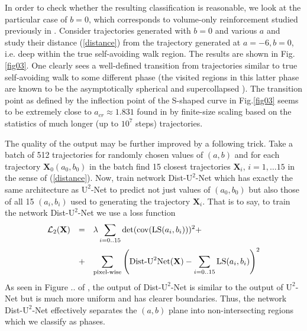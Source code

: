 \documentclass[aps,a4paper,twocolumn,showpacs]{revtex4}
\newcommand{\eq}[1]{(\ref{#1})}
\newcommand{\fig}[1]{Fig.\ref{#1}}
\newcommand{\be}{\begin{equation}}
\newcommand{\ee}{\end{equation}}
\newcommand{\ve}{\mathbf}
\begin{document}
In order to check whether the resulting classification is reasonable, we look at the particular case of $b=0$, which corresponds to volume-only reinforcement studied previously in \cite{sapozhnikov, ordemann1, ordemann2,foster}. Consider trajectories generated with $b=0$ and various $a$ and study their distance \eq{distance} from the trajectory generated at $a=-6,b=0$, i.e. deep within the true self-avoiding walk \cite{amit_parisi_peliti83} region. The results are shown in \fig{fig03}. One clearly sees a well-defined transition from trajectories similar to true self-avoiding walk to some different phase (the visited regions in this latter phase are known to be the asymptotically spherical and supercollapsed \cite{sapozhnikov, ordemann1}). The transition point as defined by the inflection point of the S-shaped curve in \fig{fig03} seems to be extremely close to $a_{cr} \approx 1.831$ found in  \cite{ordemann1} by finite-size scaling based on the statistics of much longer (up to $10^7$ steps) trajectories.   

The quality of the output may be further improved by a following trick.  Take a batch of 512 trajectories for randomly chosen values of $(a,b)$ and for each trajectory $\ve X_0 (a_0,b_0)$ in the batch find 15 closest trajectories $\ve X_i, \, i=1,\dots 15$ in the sense of \eq{distance}. Now, train network Dist-$\text{U}^{2}$-Net which has exactly the same architecture as $\text{U}^{2}$-Net to predict not just values of $(a_0,b_0)$ but also those of all 15 $(a_i,b_i)$ used to generating the trajectory $\ve X_i$. That is to say, to train the network Dist-$\text{U}^{2}$-Net we use a loss function  
\be
\begin{array}{rll}
 \mathcal{L}_2(\ve X) & = & \displaystyle \lambda \sum_{i=0..15} \det(\text{cov}(\text{LS}(a_i,b_i)))^{2} + \medskip \\
& + & \displaystyle \sum_{\text{pixel-wise}} \left(\text{Dist-U}^{2}\text{Net}(\ve X)- \sum_{i=0..15}\text{LS}(a_i,b_i)\right)^{2}
\end{array}
\label{loss}
\ee
As seen in Figure .. of \cite{supp}, the output of Dist-$\text{U}^{2}$-Net is similar to the output of $\text{U}^{2}$-Net but is much more uniform and has clearer boundaries. Thus, the network Dist-$\text{U}^{2}$-Net effectively separates the $(a,b)$ plane into non-intersecting regions which we classify as phases.   
\end{document}
